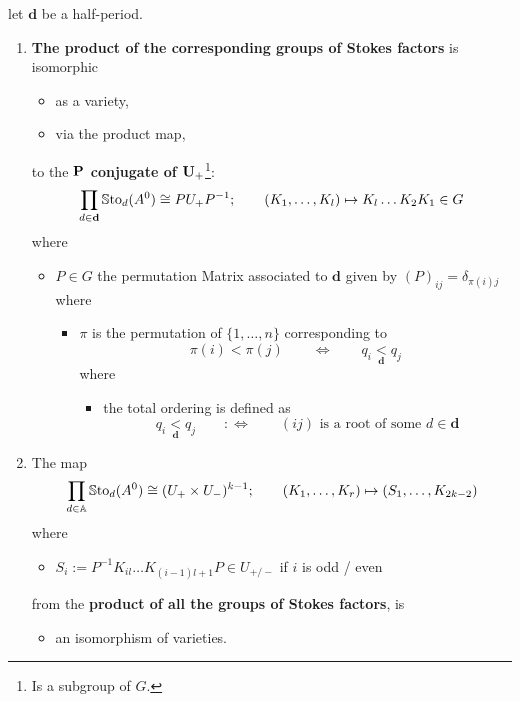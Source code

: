 \begin{lem}[3.2]
  let $\textbf{d}$ be a half-period.
  \begin{enumerate}
    \item \textbf{The product of the corresponding groups of Stokes factors} is
      isomorphic
      \begin{itemize}
        \item as a variety,
        \item via the product map,
      \end{itemize}
      to the \textbf{$\bf P$ conjugate of $\bf U_+$}\footnote{Is a subgroup of
      $G$.}:
      \[
        \prod_{d\in\textbf{d}}\operatorname{\mathbb{S}to}_d(A^0)\cong PU_+P^{-1} ;
        \qquad
        (K_1,\dots,K_l)\mapsto K_l\dots K_2K_1\in G
      \]
      where
      \begin{itemize}
        \item $P\in G$ the permutation Matrix associated to $\textbf{d}$ given
          by $(P)_{ij}=\delta_{\pi(i)j}$ where
          \begin{itemize}
            \item $\pi$ is the permutation of $\{1,\dots,n\}$ corresponding to
            \[
              \pi(i)<\pi(j)
              \qquad \Leftrightarrow \qquad
              q_i\underset{\textbf{d}}{<}q_j
            \]
            where
            \begin{itemize}
              \item the total ordering is defined as
                \[
                  q_i\underset{\textbf{d}}{<}q_j \qquad :\Leftrightarrow
                    \qquad (ij) \text{ is a root of some } d\in\textbf{d}
                \]
            \end{itemize}
          \end{itemize}
      \end{itemize}
    \item The map
      \[
        \prod_{d\in\mathbb{A}}\operatorname{\mathbb{S}to}_d(A^0)\cong (U_+\times U_-)^{k-1} ;
        \qquad
        (K_1,\dots,K_r)\mapsto (S_1,\dots,K_{2k-2})
      \]
      where
      \begin{itemize}
        \item $S_i:=P^{-1}K_{il}\dots K_{(i-1)l+1}P\in U_{+/-}$ if $i$ is
        odd / even
      \end{itemize}
      from the \textbf{product of all the groups of
      Stokes factors}, is
      \begin{itemize}
        \item an isomorphism of varieties.
      \end{itemize}
  \end{enumerate}
\end{lem}

